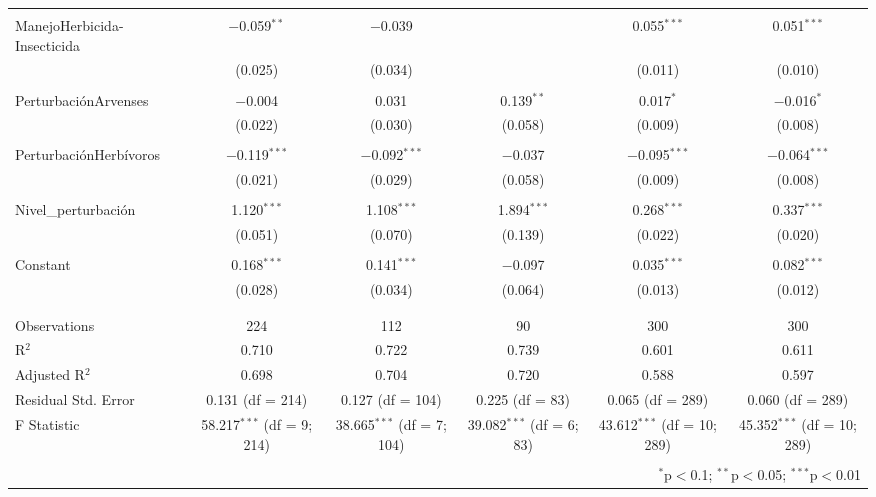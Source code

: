 \documentclass[spanish,11pt]{article}
\begin{document}
\begin{table}[!htbp]
\begin{tabular}{@{\extracolsep{5pt}}lccccc}
  & & & & & \\ 
 ManejoHerbicida-Insecticida & $-$0.059$^{**}$ & $-$0.039 &  & 0.055$^{***}$ & 0.051$^{***}$ \\ 
  & (0.025) & (0.034) &  & (0.011) & (0.010) \\ 
  & & & & & \\ 
 PerturbaciónArvenses & $-$0.004 & 0.031 & 0.139$^{**}$ & 0.017$^{*}$ & $-$0.016$^{*}$ \\ 
  & (0.022) & (0.030) & (0.058) & (0.009) & (0.008) \\ 
  & & & & & \\ 
 PerturbaciónHerbívoros & $-$0.119$^{***}$ & $-$0.092$^{***}$ & $-$0.037 & $-$0.095$^{***}$ & $-$0.064$^{***}$ \\ 
  & (0.021) & (0.029) & (0.058) & (0.009) & (0.008) \\ 
  & & & & & \\ 
 Nivel\_perturbación & 1.120$^{***}$ & 1.108$^{***}$ & 1.894$^{***}$ & 0.268$^{***}$ & 0.337$^{***}$ \\ 
  & (0.051) & (0.070) & (0.139) & (0.022) & (0.020) \\ 
  & & & & & \\ 
 Constant & 0.168$^{***}$ & 0.141$^{***}$ & $-$0.097 & 0.035$^{***}$ & 0.082$^{***}$ \\ 
  & (0.028) & (0.034) & (0.064) & (0.013) & (0.012) \\ 
  & & & & & \\ 
\hline \\[-1.8ex] 
Observations & 224 & 112 & 90 & 300 & 300 \\ 
R$^{2}$ & 0.710 & 0.722 & 0.739 & 0.601 & 0.611 \\ 
Adjusted R$^{2}$ & 0.698 & 0.704 & 0.720 & 0.588 & 0.597 \\ 
Residual Std. Error & 0.131 (df = 214) & 0.127 (df = 104) & 0.225 (df = 83) & 0.065 (df = 289) & 0.060 (df = 289) \\ 
F Statistic & 58.217$^{***}$ (df = 9; 214) & 38.665$^{***}$ (df = 7; 104) & 39.082$^{***}$ (df = 6; 83) & 43.612$^{***}$ (df = 10; 289) & 45.352$^{***}$ (df = 10; 289) \\ 
\hline 
\hline \\[-1.8ex] 
\multicolumn{6}{r}{$^{*}$p$<$0.1; $^{**}$p$<$0.05; $^{***}$p$<$0.01} \\ 
\end{tabular} 
\end{table} 
\end{document}

